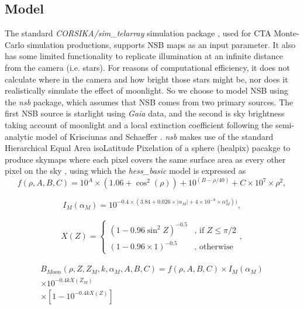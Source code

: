 \subsection{Model}
\label{sec:intro:model}

The standard \textit{CORSIKA/sim\_telarray} simulation package \cite{simtel}, used for CTA Monte-Carlo simulation productions, supports NSB maps as an input parameter. It also has some limited functionality to replicate illumination at an infinite distance from the camera (i.e. stars). For reasons of computational efficiency, it does not calculate where in the camera and how bright those stars might be, nor does it realistically simulate the effect of moonlight. So we choose to model NSB using the \textit{nsb} package, which assumes that NSB comes from two primary sources. The first NSB source is starlight using \textit{Gaia} data, and the second is sky brightness taking account of moonlight and a local extinction coefficient following the semi-analytic model of Krisciunas and Schaeffer \cite{Krisciunas}. \textit{nsb} makes use of the standard Hierarchical Equal Area isoLatitude Pixelation of a sphere (healpix) pacakge to produce skymaps where each pixel covers the same surface area as every other pixel on the sky \cite{healpix}, using which the \textit{hess\_basic} model is expressed as
\begin{equation}
    f(\rho, A, B, C) = 10^{A}\times (1.06+\cos^2(\rho))+10^{(B-\rho/40)}+C \times 10^7 \times \rho^2,
    \label{eq:f}
\end{equation}

\begin{equation}
    I_{M} (\alpha_{M}) = 10^{-0.4 \times (3.84 + 0.026 \times |\alpha_{M}| + 4 \times 10^{-9} \times \alpha_{M}^4))},
    \label{eq:Im}
\end{equation}

\begin{equation}
    \begin{split}
    X(Z)=\begin{cases} (1-0.96\sin^2 Z)^{-0.5} & \mbox{, if }  Z\leq\pi/2 \\ (1 - 0.96 \times 1)^{-0.5} & \mbox{, otherwise } \end{cases},
    \end{split}
\end{equation}

\begin{equation}
\begin{split}
    B_{Moon}(\rho,Z,Z_{M},k,\alpha_{M},A,B,C)=f(\rho,A,B,C) \times I_{M}(\alpha_{M}) \\ \times 10^{-0.4kX(Z_{M})}\\ \times [1-10^{-0.4 k X(Z)}]
\end{split}
\end{equation}

